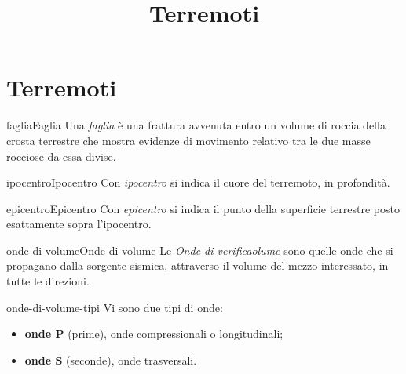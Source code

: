 \documentclass[preview]{standalone}
\begin{document}
\title{Terremoti}
\genpage


\section{Terremoti}


\begin{snippetdefinition}{faglia}{Faglia}
    Una \textit{faglia} è una frattura avvenuta entro
    un volume di roccia della crosta terrestre che mostra evidenze di
    movimento relativo tra le due masse rocciose da essa divise.
\end{snippetdefinition}

\begin{snippetdefinition}{ipocentro}{Ipocentro}
    Con \textit{ipocentro} si indica il cuore del terremoto, in profondità.
\end{snippetdefinition}

\begin{snippetdefinition}{epicentro}{Epicentro}
    Con \textit{epicentro} si indica il punto della superficie terrestre posto esattamente sopra l'ipocentro.
\end{snippetdefinition}


\begin{snippetdefinition}{onde-di-volume}{Onde di volume}
    Le \textit{Onde di verificaolume} sono quelle onde che si propagano dalla sorgente sismica,
    attraverso il volume del mezzo interessato, in tutte le direzioni.
\end{snippetdefinition}

\begin{snippet}{onde-di-volume-tipi}
    Vi sono due tipi di onde:
    \begin{itemize}
        \item \textbf{onde P} (prime), onde compressionali o longitudinali;
        \item \textbf{onde S} (seconde), onde trasversali.
    \end{itemize}
\end{snippet}

\end{document}
